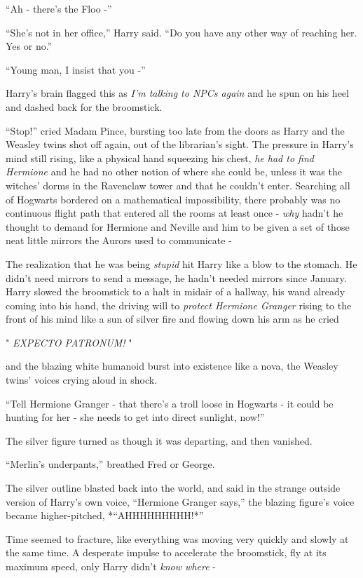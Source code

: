 ``Ah - there's the Floo -''

``She's not in her office,'' Harry said. ``Do you have any other way of
reaching her. Yes or no.''

``Young man, I insist that you -''

Harry's brain flagged this as \emph{I'm talking to NPCs again} and he
spun on his heel and dashed back for the broomstick.

``Stop!'' cried Madam Pince, bursting too late from the doors as Harry
and the Weasley twins shot off again, out of the librarian's sight. The
pressure in Harry's mind still rising, like a physical hand squeezing
his chest, \emph{he had to find Hermione} and he had no other notion of
where she could be, unless it was the witches' dorms in the Ravenclaw
tower and that he couldn't enter. Searching all of Hogwarts bordered on
a mathematical impossibility, there probably was no continuous flight
path that entered all the rooms at least once - \emph{why} hadn't he
thought to demand for Hermione and Neville and him to be given a set of
those neat little mirrors the Aurors used to communicate -

The realization that he was being \emph{stupid} hit Harry like a blow to
the stomach. He didn't need mirrors to send a message, he hadn't needed
mirrors since January. Harry slowed the broomstick to a halt in midair
of a hallway, his wand already coming into his hand, the driving will to
\emph{protect Hermione Granger} rising to the front of his mind like a
sun of silver fire and flowing down his arm as he cried

" \emph{EXPECTO PATRONUM!} "

and the blazing white humanoid burst into existence like a nova, the
Weasley twins' voices crying aloud in shock.

``Tell Hermione Granger - that there's a troll loose in Hogwarts - it
could be hunting for her - she needs to get into direct sunlight, now!''

The silver figure turned as though it was departing, and then vanished.

``Merlin's underpants,'' breathed Fred or George.

The silver outline blasted back into the world, and said in the strange
outside version of Harry's own voice, ``Hermione Granger says,'' the
blazing figure's voice became higher-pitched, *``AHHHHHHHHH!*''

Time seemed to fracture, like everything was moving very quickly and
slowly at the same time. A desperate impulse to accelerate the
broomstick, fly at its maximum speed, only Harry didn't \emph{know
where} -

